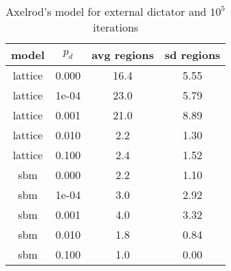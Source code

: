 
\begin{table}[htbp]
\centering
\caption{Axelrod's model for external dictator and $10^5$ iterations} 
\begin{tabular}{cccc}
  
model & $p_d$ & avg regions & sd regions \\ 
  \hline
\midrule
lattice & 0.000 & 16.4 & 5.55\\
lattice & 1e-04 & 23.0 & 5.79\\
lattice & 0.001 & 21.0 & 8.89\\
lattice & 0.010 & 2.2 & 1.30\\
lattice & 0.100 & 2.4 & 1.52\\
sbm & 0.000 & 2.2 & 1.10\\
sbm & 1e-04 & 3.0 & 2.92\\
sbm & 0.001 & 4.0 & 3.32\\
sbm & 0.010 & 1.8 & 0.84\\
sbm & 0.100 & 1.0 & 0.00\\
\bottomrule
\end{tabular}

\label{tab:dictatore5}
\end{table}
